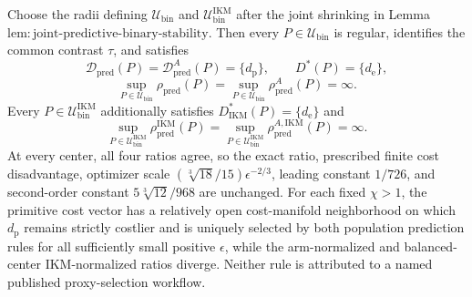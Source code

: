 Choose the radii defining \(\mathcal U_{\mathrm{bin}}\) and \(\mathcal U_{\mathrm{bin}}^{\mathrm{IKM}}\) after the joint shrinking in Lemma~\(\mathrm{lem{:}joint\text{-}predictive\text{-}binary\text{-}stability}\). Then every \(P\in\mathcal U_{\mathrm{bin}}\) is regular, identifies the common contrast \(\tau\), and satisfies
\[
 \mathcal D_{\mathrm{pred}}(P)=\mathcal D_{\mathrm{pred}}^A(P)=\{d_{\mathrm p}\},
 \qquad D^*(P)=\{d_{\mathrm e}\},
\]
\[
 \sup_{P\in\mathcal U_{\mathrm{bin}}}\rho_{\mathrm{pred}}(P)
 =\sup_{P\in\mathcal U_{\mathrm{bin}}}\rho_{\mathrm{pred}}^A(P)=\infty. \tag{1}
\]
Every \(P\in\mathcal U_{\mathrm{bin}}^{\mathrm{IKM}}\) additionally satisfies \(D_{\mathrm{IKM}}^*(P)=\{d_{\mathrm e}\}\) and
\[
 \sup_{P\in\mathcal U_{\mathrm{bin}}^{\mathrm{IKM}}}
 \rho_{\mathrm{pred}}^{\mathrm{IKM}}(P)
 =\sup_{P\in\mathcal U_{\mathrm{bin}}^{\mathrm{IKM}}}
 \rho_{\mathrm{pred}}^{A,\mathrm{IKM}}(P)=\infty. \tag{2}
\]
At every center, all four ratios agree, so the exact ratio, prescribed finite cost disadvantage, optimizer scale \((\sqrt[3]{18}/15)\epsilon^{-2/3}\), leading constant \(1/726\), and second-order constant \(5\sqrt[3]{12}/968\) are unchanged. For each fixed \(\chi>1\), the primitive cost vector has a relatively open cost-manifold neighborhood on which \(d_{\mathrm p}\) remains strictly costlier and is uniquely selected by both population prediction rules for all sufficiently small positive \(\epsilon\), while the arm-normalized and balanced-center IKM-normalized ratios diverge. Neither rule is attributed to a named published proxy-selection workflow.